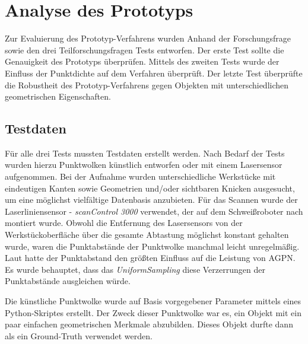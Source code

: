 \chapter{Analyse des Prototyps}
Zur Evaluierung des Prototyp-Verfahrens wurden Anhand der Forschungsfrage sowie den drei Teilforschungsfragen Tests entworfen. Der erste Test sollte die Genauigkeit des Prototyps überprüfen. Mittels des zweiten Tests wurde der Einfluss der Punktdichte auf dem Verfahren überprüft. Der letzte Test überprüfte die Robustheit des Prototyp-Verfahrens gegen Objekten mit unterschiedlichen geometrischen Eigenschaften.

\section{Testdaten}
Für alle drei Tests mussten Testdaten erstellt werden. Nach Bedarf der Tests wurden hierzu Punktwolken künstlich entworfen oder mit einem Lasersensor aufgenommen. Bei der Aufnahme wurden unterschiedliche Werkstücke mit eindeutigen Kanten sowie Geometrien und/oder sichtbaren Knicken ausgesucht, um eine möglichst vielfältige Datenbasis anzubieten. Für das Scannen wurde der Laserliniensensor - \textit{scanControl 3000} verwendet, der auf dem Schweißroboter nach \textcite[39]{savla_intelligente_2022} montiert wurde. Obwohl die Entfernung des Lasersensors von der Werkstückoberfläche über die gesamte Abtastung möglichst konstant gehalten wurde, waren die Punktabstände der Punktwolke manchmal leicht unregelmäßig. Laut \textcite[9]{ni_edge_2016} hatte der Punktabstand den größten Einfluss auf die Leistung von AGPN. Es wurde behauptet, dass das \textit{UniformSampling} diese Verzerrungen der Punktabstände ausgleichen würde. 

Die künstliche Punktwolke wurde auf Basis vorgegebener Parameter mittels eines Python-Skriptes erstellt. Der Zweck dieser Punktwolke war es, ein Objekt mit ein paar einfachen geometrischen Merkmale abzubilden. Dieses Objekt durfte dann als ein Ground-Truth verwendet werden.